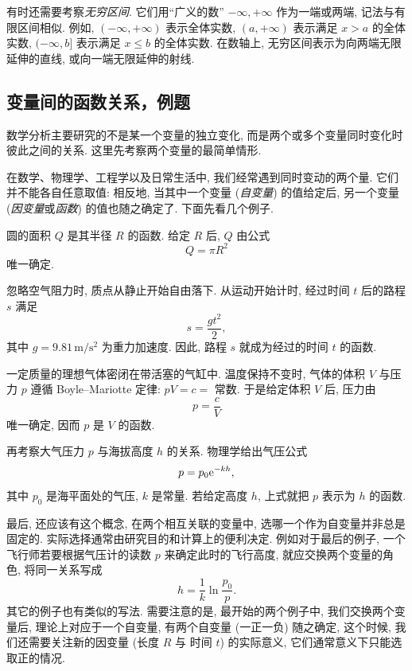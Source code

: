 有时还需要考察\emph{无穷区间}.
它们用“广义的数” $-\infty,+\infty$ 作为一端或两端, 记法与有限区间相似.
例如, $(-\infty,+\infty)$ 表示全体实数,
$(a,+\infty)$ 表示满足 $x>a$ 的全体实数,
$(-\infty,b]$ 表示满足 $x\leqslant b$ 的全体实数.
在数轴上, 无穷区间表示为向两端无限延伸的直线, 或向一端无限延伸的射线.

\subsection{变量间的函数关系，例题}\label{subsec:44}
数学分析主要研究的不是某一个变量的独立变化,
而是两个或多个变量同时变化时彼此之间的关系.
这里先考察两个变量的最简单情形.

在数学、物理学、工程学以及日常生活中,
我们经常遇到同时变动的两个量.
它们并不能各自任意取值:
相反地,
当其中一个变量 (\emph{自变量}) 的值给定后,
另一个变量 (\emph{因变量}或\emph{函数}) 的值也随之确定了.
下面先看几个例子.

\label{ex:circle_area_function}
圆的面积 $Q$ 是其半径 $R$ 的函数.
给定 $R$ 后, $Q$ 由公式
$$
Q=\pi R^2
$$
唯一确定.

\label{ex:free_fall_function}
忽略空气阻力时, 质点从静止开始自由落下.
从运动开始计时, 经过时间 $t$ 后的路程 $s$ 满足
$$
s=\frac{gt^2}{2},
$$
其中 $g=9.81\,\mathrm{m/s^2}$ 为重力加速度.
因此, 路程 $s$ 就成为经过的时间 $t$ 的函数.

\label{ex:boyle_mariotte_function}
一定质量的理想气体密闭在带活塞的气缸中.
温度保持不变时, 气体的体积 $V$ 与压力 $p$ 遵循 Boyle--Mariotte 定律: $pV=c=$ 常数.
于是给定体积 $V$ 后, 压力由
$$
p=\frac{c}{V}
$$
唯一确定, 因而 $p$ 是 $V$ 的函数.

\label{ex:barometric_function}
再考察大气压力 $p$ 与海拔高度 $h$ 的关系.
物理学给出气压公式
$$
p=p_0\mathrm{e}^{-kh},
$$
其中 $p_0$ 是海平面处的气压, $k$ 是常量.
若给定高度 $h$, 上式就把 $p$ 表示为 $h$ 的函数.

最后, 还应该有这个概念, 在两个相互关联的变量中, 选哪一个作为自变量并非总是固定的.
实际选择通常由研究目的和计算上的便利决定.
例如对于最后的例子, 一个飞行师若要根据气压计的读数 $p$ 来确定此时的飞行高度,
就应交换两个变量的角色, 将同一关系写成
$$
h=\frac{1}{k}\ln\frac{p_0}{p}.
$$
其它的例子也有类似的写法.
需要注意的是,
最开始的两个例子中, 我们交换两个变量后,
理论上对应于一个自变量, 有两个自变量 (一正一负) 随之确定,
这个时候, 我们还需要关注新的因变量 (长度 $R$ 与 时间 $t$) 的实际意义,
它们通常意义下只能选取正的情况.


